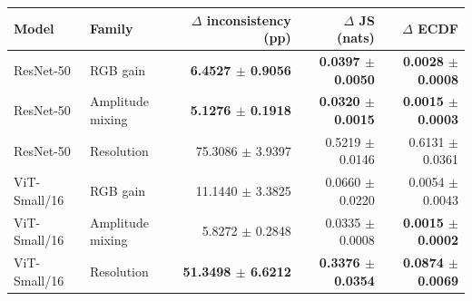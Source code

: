 \begin{tabular}{llrrr}
\toprule
Model & Family & $\Delta$ inconsistency (pp) & $\Delta$ JS (nats) & $\Delta$ ECDF \\
\midrule
ResNet-50 & RGB gain & \textbf{6.4527 $\pm$ 0.9056} & \textbf{0.0397 $\pm$ 0.0050} & \textbf{0.0028 $\pm$ 0.0008} \\
ResNet-50 & Amplitude mixing & \textbf{5.1276 $\pm$ 0.1918} & \textbf{0.0320 $\pm$ 0.0015} & \textbf{0.0015 $\pm$ 0.0003} \\
ResNet-50 & Resolution & 75.3086 $\pm$ 3.9397 & 0.5219 $\pm$ 0.0146 & 0.6131 $\pm$ 0.0361 \\
ViT-Small/16 & RGB gain & 11.1440 $\pm$ 3.3825 & 0.0660 $\pm$ 0.0220 & 0.0054 $\pm$ 0.0043 \\
ViT-Small/16 & Amplitude mixing & 5.8272 $\pm$ 0.2848 & 0.0335 $\pm$ 0.0008 & \textbf{0.0015 $\pm$ 0.0002} \\
ViT-Small/16 & Resolution & \textbf{51.3498 $\pm$ 6.6212} & \textbf{0.3376 $\pm$ 0.0354} & \textbf{0.0874 $\pm$ 0.0069} \\
\bottomrule
\end{tabular}
